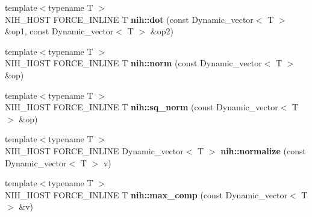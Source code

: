 \begin{DoxyCompactItemize}
\item 
\hypertarget{group__vectors_ga72d06d3777274c5086cec87f3e99e461}{
{\footnotesize template$<$typename T $>$ }\\\-N\-I\-H\-\_\-\-H\-O\-S\-T \-F\-O\-R\-C\-E\-\_\-\-I\-N\-L\-I\-N\-E \-T {\bfseries nih\-::dot} (const \-Dynamic\-\_\-vector$<$ \-T $>$ \&op1, const \-Dynamic\-\_\-vector$<$ \-T $>$ \&op2)}
\label{group__vectors_ga72d06d3777274c5086cec87f3e99e461}

\item 
\hypertarget{group__vectors_ga49ad4aac876edfaa63728dc050676fba}{
{\footnotesize template$<$typename T $>$ }\\\-N\-I\-H\-\_\-\-H\-O\-S\-T \-F\-O\-R\-C\-E\-\_\-\-I\-N\-L\-I\-N\-E \-T {\bfseries nih\-::norm} (const \-Dynamic\-\_\-vector$<$ \-T $>$ \&op)}
\label{group__vectors_ga49ad4aac876edfaa63728dc050676fba}

\item 
\hypertarget{group__vectors_ga9bb86f8547e3fa69786ebd68dc89057d}{
{\footnotesize template$<$typename T $>$ }\\\-N\-I\-H\-\_\-\-H\-O\-S\-T \-F\-O\-R\-C\-E\-\_\-\-I\-N\-L\-I\-N\-E \-T {\bfseries nih\-::sq\-\_\-norm} (const \-Dynamic\-\_\-vector$<$ \-T $>$ \&op)}
\label{group__vectors_ga9bb86f8547e3fa69786ebd68dc89057d}

\item 
\hypertarget{group__vectors_ga2cd050854a2ba194a8a51654c94ff3ca}{
{\footnotesize template$<$typename T $>$ }\\\-N\-I\-H\-\_\-\-H\-O\-S\-T \-F\-O\-R\-C\-E\-\_\-\-I\-N\-L\-I\-N\-E \*
\-Dynamic\-\_\-vector$<$ \-T $>$ {\bfseries nih\-::normalize} (const \-Dynamic\-\_\-vector$<$ \-T $>$ v)}
\label{group__vectors_ga2cd050854a2ba194a8a51654c94ff3ca}

\item 
\hypertarget{group__vectors_ga49b988bb0618de2ec668efe484c47e43}{
{\footnotesize template$<$typename T $>$ }\\\-N\-I\-H\-\_\-\-H\-O\-S\-T \-F\-O\-R\-C\-E\-\_\-\-I\-N\-L\-I\-N\-E \-T {\bfseries nih\-::max\-\_\-comp} (const \-Dynamic\-\_\-vector$<$ \-T $>$ \&v)}
\label{group__vectors_ga49b988bb0618de2ec668efe484c47e43}

\end{DoxyCompactItemize}


